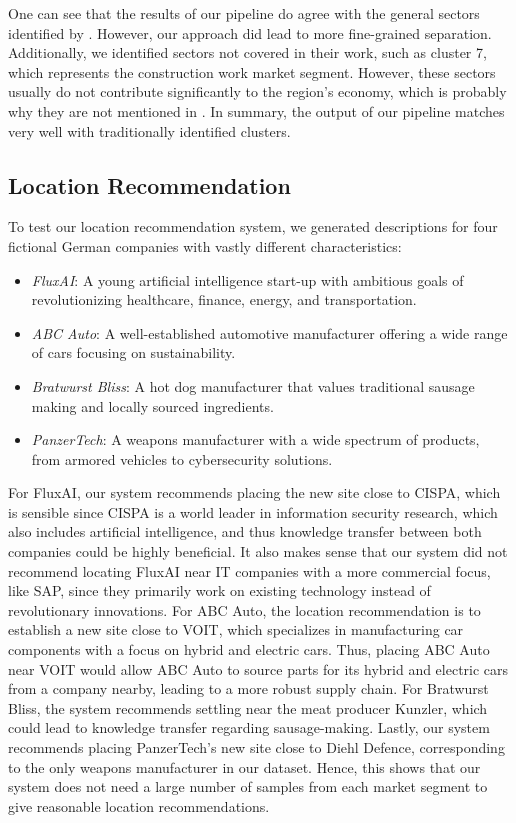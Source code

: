 \documentclass[conference]{IEEEtran}
\begin{document}
One can see that the results of our pipeline do agree with the general sectors identified by \cite{saarlandeco2}. However, our approach did lead to more fine-grained separation. Additionally, we identified sectors not covered in their work, such as cluster 7, which represents the construction work market segment. However, these sectors usually do not contribute significantly to the region's economy, which is probably why they are not mentioned in \cite{saarlandeco2}. In summary, the output of our pipeline matches very well with traditionally identified clusters.

\subsection{Location Recommendation}
To test our location recommendation system, we generated descriptions for four fictional German companies with vastly different characteristics:
\begin{itemize}
	\item \textit{FluxAI}: A young artificial intelligence start-up with ambitious goals of revolutionizing healthcare, finance, energy, and transportation.
	\item \textit{ABC Auto}: A well-established automotive manufacturer offering a wide range of cars focusing on sustainability.
	\item \textit{Bratwurst Bliss}: A hot dog manufacturer that values traditional sausage making and locally sourced ingredients.
	\item \textit{PanzerTech}: A weapons manufacturer with a wide spectrum of products, from armored vehicles to cybersecurity solutions.
\end{itemize}

For FluxAI, our system recommends placing the new site close to CISPA, which is sensible since CISPA is a world leader in information security research, which also includes artificial intelligence, and thus knowledge transfer between both companies could be highly beneficial. It also makes sense that our system did not recommend locating FluxAI near IT companies with a more commercial focus, like SAP, since they primarily work on existing technology instead of revolutionary innovations.
For ABC Auto, the location recommendation is to establish a new site close to VOIT, which specializes in manufacturing car components with a focus on hybrid and electric cars. Thus, placing ABC Auto near VOIT would allow ABC Auto to source parts for its hybrid and electric cars from a company nearby, leading to a more robust supply chain.
For Bratwurst Bliss, the system recommends settling near the meat producer Kunzler, which could lead to knowledge transfer regarding sausage-making.
Lastly, our system recommends placing PanzerTech's new site close to Diehl Defence, corresponding to the only weapons manufacturer in our dataset. Hence, this shows that our system does not need a large number of samples from each market segment to give reasonable location recommendations.
\end{document}
